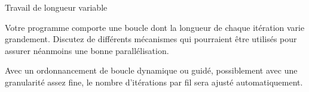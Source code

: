 \documentclass{beamer}
\begin{document}
\begin{frame}{Travail de longueur variable}
  \begin{question}
Votre programme comporte une boucle dont la longueur de chaque itération varie grandement. Discutez de différents mécanismes qui pourraient être utilisés pour assurer néanmoins une bonne parallélisation.
  \end{question}
  \begin{answer}
Avec un ordonnancement de boucle dynamique ou guidé, possiblement avec une granularité assez fine, le nombre d'itérations par fil sera ajusté automatiquement.
  \end{answer}
\end{frame}
\end{document}
